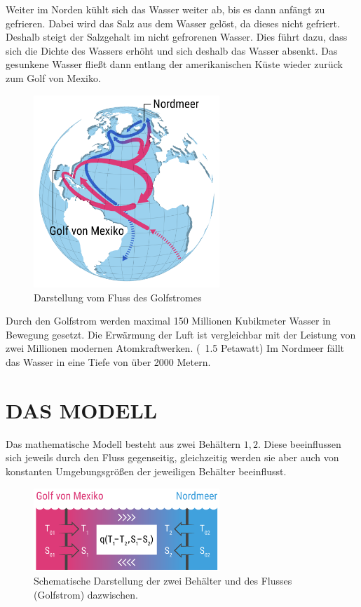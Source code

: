 \documentclass[a4paper,twoside]{article}
\begin{document}
	Weiter im Norden kühlt sich das Wasser weiter ab, bis es dann anfängt zu gefrieren. Dabei wird das Salz aus dem Wasser gelöst, da dieses nicht gefriert. Deshalb steigt der Salzgehalt im nicht gefrorenen Wasser. Dies führt dazu, dass sich die Dichte des Wassers erhöht und sich deshalb das Wasser absenkt. Das gesunkene Wasser fließt dann entlang der amerikanischen Küste wieder zurück zum Golf von Mexiko.
	\begin{figure}[!h]
  		\centering
 		\includegraphics[width=7cm]{../Diagramme/golfstrom_fluss.png}
  		\caption{Darstellung vom Fluss des Golfstromes}
  		\label{fig:flussGolfstrom}
	\end{figure}

Durch den Golfstrom werden maximal 150 Millionen Kubikmeter Wasser in Bewegung gesetzt. 
Die Erwärmung der Luft ist vergleichbar mit der Leistung von zwei Millionen modernen Atomkraftwerken. (~1.5 Petawatt)
Im Nordmeer fällt das Wasser in eine Tiefe von über 2000 Metern.
 
	

	
	\section{\uppercase{Das Modell}}\label{sec:Modell}
	
	
	\noindent Das mathematische Modell besteht aus zwei Behältern \(1,2\). Diese beeinflussen sich jeweils durch den Fluss gegenseitig, gleichzeitig werden sie aber auch von konstanten Umgebungsgrößen der jeweiligen Behälter beeinflusst.
	
	\begin{figure}[!h]
  		\centering
 		\includegraphics[width=7cm]{../Diagramme/skizze_modell.png}
  		\caption{Schematische Darstellung der zwei Behälter und des Flusses (Golfstrom) dazwischen.}
  		\label{fig:modell}
	\end{figure}
	
\end{document}
